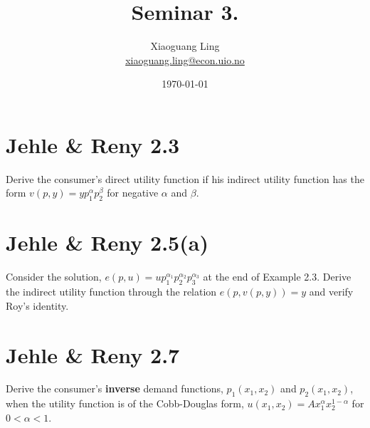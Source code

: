 \documentclass{article}
\title{Seminar 3.}
\author{Xiaoguang Ling \\  \href{xiaoguang.ling@econ.uio.no}{xiaoguang.ling@econ.uio.no}}
\date{\today}
\begin{document}
\maketitle

\section{Jehle \& Reny 2.3}
Derive the consumer’s direct utility function if his indirect utility function has the form $v(p, y) =
yp_1^\alpha p_2^\beta$ for negative $\alpha$ and $\beta$.

\section{Jehle \& Reny 2.5(a)}
Consider the solution, $e(p, u) = up_1^{\alpha_1}p_2^{\alpha_2}p_3^{\alpha_3}$ at the end of Example 2.3.
Derive the indirect utility function through the relation $e(p, v(p, y)) = y$ and verify Roy's
identity.

\section{Jehle \& Reny 2.7}
Derive the consumer's \textbf{inverse} demand functions, $p_1(x_1, x_2)$ and $p_2(x_1, x_2)$, 
when the utility function is of the Cobb-Douglas form, $u(x_1, x_2) = Ax_1^{\alpha}x_2^{1-\alpha}$
for $0 < \alpha < 1$.
\end{document}
